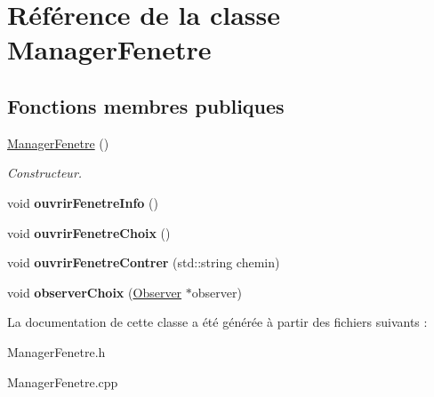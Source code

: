 \hypertarget{classManagerFenetre}{\section{\-Référence de la classe \-Manager\-Fenetre}
\label{classManagerFenetre}
}
\subsection*{\-Fonctions membres publiques}
\begin{DoxyCompactItemize}
\item 
\hypertarget{classManagerFenetre_adde6ceef42d5ed5000cb9dbc76ef1442}{\hyperlink{classManagerFenetre_adde6ceef42d5ed5000cb9dbc76ef1442}{\-Manager\-Fenetre} ()}\label{classManagerFenetre_adde6ceef42d5ed5000cb9dbc76ef1442}

\begin{DoxyCompactList}\small\item\em \-Constructeur. \end{DoxyCompactList}\item 
\hypertarget{classManagerFenetre_a946bf5d3b2fba1cdca3713a0d850c0c2}{void {\bfseries ouvrir\-Fenetre\-Info} ()}\label{classManagerFenetre_a946bf5d3b2fba1cdca3713a0d850c0c2}

\item 
\hypertarget{classManagerFenetre_a28623b59c8cca914ba1c91a8b17999ff}{void {\bfseries ouvrir\-Fenetre\-Choix} ()}\label{classManagerFenetre_a28623b59c8cca914ba1c91a8b17999ff}

\item 
\hypertarget{classManagerFenetre_a180deb18bd2f3754d1f0e85eeeab414f}{void {\bfseries ouvrir\-Fenetre\-Contrer} (std\-::string chemin)}\label{classManagerFenetre_a180deb18bd2f3754d1f0e85eeeab414f}

\item 
\hypertarget{classManagerFenetre_a400a128ee4377b13c4e680e6eba18921}{void {\bfseries observer\-Choix} (\hyperlink{classObserver}{\-Observer} $\ast$observer)}\label{classManagerFenetre_a400a128ee4377b13c4e680e6eba18921}

\end{DoxyCompactItemize}


\-La documentation de cette classe a été générée à partir des fichiers suivants \-:\begin{DoxyCompactItemize}
\item 
\-Manager\-Fenetre.\-h\item 
\-Manager\-Fenetre.\-cpp\end{DoxyCompactItemize}
